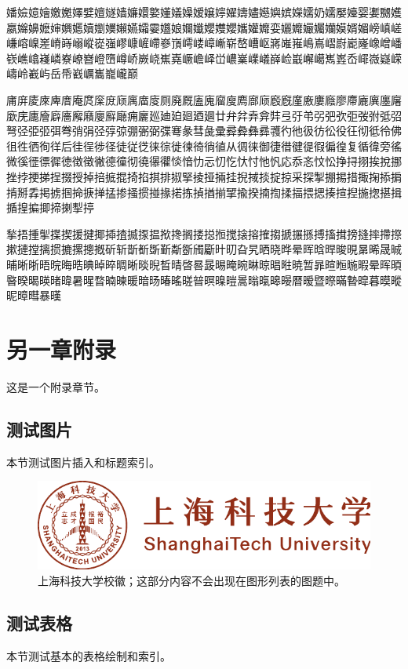 \documentclass[
  fontset = mac,
]{shtthesis}
\begin{document}
{\heiti 嬏嬐嬑嬒嬓嬔嬕嬖嬗嬘嫱嬚嬛嬜嬞嬟嬠嫒嬢嬣嬥嬦嬧嬨嬩嫔嬫嬬奶嬬嬮嬯婴嬱嬲嬳嬴嬵嬶嬷婶嬹嬺嬻嬼嬽嬾嬿孀孁孂娘孄孅孆孇孆孈孉孊娈孋孊孍孎孏嫫婿媚嵭嵮嵯嵰嵱嵲嵳嵴嵵嵶嵷嵸嵹嵺嵻嵼嵽嵾嵿嶀嵝嶂嶃崭嶅嶆岖嶈嶉嶊嶋嶌嶍嶎嶏嶐嶑嶒嶓嵚嶕嶖嶘嶙嶚嶛嶜嶝嶞嶟峤嶡峣嶣嶤嶥嶦峄峃嶩嶪嶫嶬嶭崄嶯嶰嶱嶲嶳岙嶵嶶嶷嵘嶹岭嶻屿岳帋巀巁巂巃巄巅}

{\kaishu 庯庰庱庲庳庴庵庹庺庻庼庽庿廀厕廃厩廅廆廇廋廌廍庼廏廐廑廒廔廕廖廗廘廙廛廜廞庑廤廥廦廧廨廭廮廯廰痈廲廵廸廹廻廼廽廿弁弅弆弇弉弖弙弚弜弝弞弡弢弣弤弨弩弪弫弬弭弮弰弲弪弴弶弸弻弼弽弿彖彗彘彚彛彜彝彞彟彴彵彶彷彸役彺彻彽彾佛徂徃徆徇徉后徍徎徏径徒従徔徕徖徙徚徛徜徝从徟徕御徢徣徤徥徦徧徨复循徫旁徭微徯徰徱徲徳徴徵徶德徸彻徺忁忂惔愔忇忈忉忔忕忖忚忛応忝忞忟忪挣挦挧挨挩挪挫挬挭挮挰掇授掉掊掋掍掎掐掑排掓掔掕挜掚挂掜掝掞掟掠采探掣掤掦措掫掬掭掮掯掰掱掲掳掴掵掶掸掹掺掻掼掽掾掿拣揁揂揃揅揄揆揇揈揉揊揋揌揍揎揑揓揔揕揖揗揘揙揤揥揦揧揨}

{\fangsong 揫捂揰揱揲揳援揵揶揷揸揻揼揾揿搀搁搂搃搄搅搇搈搉搊搋搌搎搏搐搑搒摓摔摕摖摗摙摚摛掼摝摞摠摡斫斩斮斱斲斳斴斵斶斸旪旫旮旯晒晓晔晕晖晗晘晙晛晜晞晟晠晡晰晣晤晥晦晧晪晫晬晭晰晱晲晳晴晵晷晸晹晻晼晽晾晿暀暁暂暃暄暅暆暇晕晖暊暋暌暍暎暏暐暑暒暓暔暕暖暗旸暙暚暛暜暝暞暟暠暡暣暤暥暦暧暨暩暪暬暭暮暯暰昵暲暳暴暵}

\chapter{另一章附录}
这是一个附录章节。

\section{测试图片}
本节测试图片插入和标题索引。

\begin{figure}[htb]
  \centering
  \includegraphics[width=0.75\columnwidth]{shanghaitech_logo.pdf}
  \caption[上海科技大学校徽]{上海科技大学校徽；这部分内容不会出现在图形列表的图题中。}
\end{figure}

\section{测试表格}
本节测试基本的表格绘制和索引。
\end{document}
